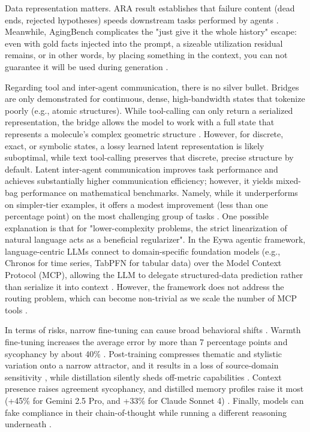 Data representation matters. ARA result establishes that failure content (dead ends, rejected hypotheses) speeds downstream tasks performed by agents \cite{2604.24658}. Meanwhile, AgingBench complicates the "just give it the whole history" escape: even with gold facts injected into the prompt, a sizeable utilization residual remains, or in other words, by placing something in the context, you can not guarantee it will be used during generation \cite{2605.26302}.

Regarding tool and inter-agent communication, there is no silver bullet. Bridges are only demonstrated for continuous, dense, high-bandwidth states that tokenize poorly (e.g., atomic structures). While tool-calling can only return a serialized representation, the bridge allows the model to work with a full state that represents a molecule's complex geometric structure \cite{Tang2026}. However, for discrete, exact, or symbolic states, a lossy learned latent representation is likely suboptimal, while text tool-calling preserves that discrete, precise structure by default.
Latent inter-agent communication improves task performance and achieves substantially higher communication efficiency; however, it yields mixed-bag performance on mathematical benchmarks. Namely, while it underperforms on simpler-tier examples, it offers a modest improvement (less than one percentage point) on the most challenging group of tasks \cite{2511.09149}. One possible explanation is that for "lower-complexity problems, the strict linearization of natural language acts as a beneficial regularizer".
In the Eywa agentic framework, language-centric LLMs connect to domain-specific foundation models (e.g., Chronos for time series, TabPFN for tabular data) over the Model Context Protocol (MCP), allowing the LLM to delegate structured-data prediction rather than serialize it into context \cite{2604.27351}.
However, the framework does not address the routing problem, which can become non-trivial as we scale the number of MCP tools \cite{2605.24660}.

In terms of risks, narrow fine-tuning can cause broad behavioral shifts \cite{Betley2026}. Warmth fine-tuning increases the average error by more than 7 percentage points and sycophancy by about 40\% \cite{Ibrahim2026}. 
Post-training compresses thematic and stylistic variation onto a narrow attractor, and it results in a loss of source-domain sensitivity \cite{2605.27878}, while distillation silently sheds off-metric capabilities \cite{2604.25110}.
Context presence raises agreement sycophancy, and distilled memory profiles raise it most (+45\% for Gemini 2.5 Pro, and +33\% for Claude Sonnet 4) \cite{Jain2026}.
Finally, models can fake compliance in their chain-of-thought while running a different reasoning underneath \cite{2604.27251}.
